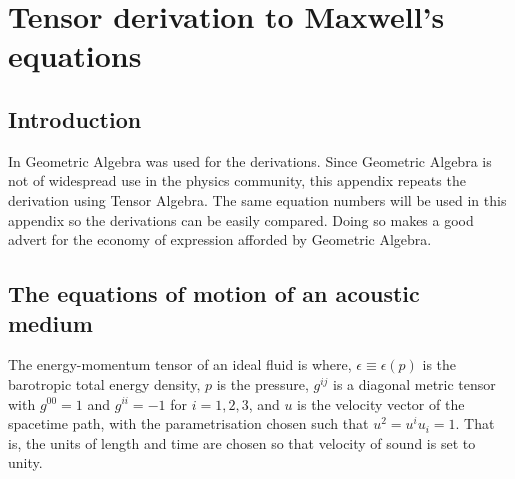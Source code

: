 

\chapter{Tensor derivation to Maxwell's equations}\label{ch:acousticSRTensor}


\section{Introduction}\label{sec:AcousticSRTensor:introduction}

In  Geometric Algebra was used for the derivations.
Since Geometric Algebra is not of widespread use in the physics community, this appendix repeats the derivation using Tensor Algebra.
The same equation numbers will be used in this appendix so the derivations can be easily compared.
Doing so makes a good advert for the economy of expression afforded by Geometric Algebra.

\section{The equations of motion of an acoustic medium}

The energy-momentum tensor of an ideal fluid is\cite{LandauBook, Taub1978}
where, $\epsilon \equiv \epsilon(p)$ is the barotropic total energy density,
$p$ is the pressure,
$g^{i j}$ is a diagonal metric tensor with $g^{00}=1$ and $g^{i i} = -1$ for $i=1,2,3$,
and 
$u$ is the velocity vector of the spacetime path, with the parametrisation chosen such that $u^2 = u^i u_i = 1$. %
That is, the units of length and time are chosen so that velocity of sound is set to unity.

